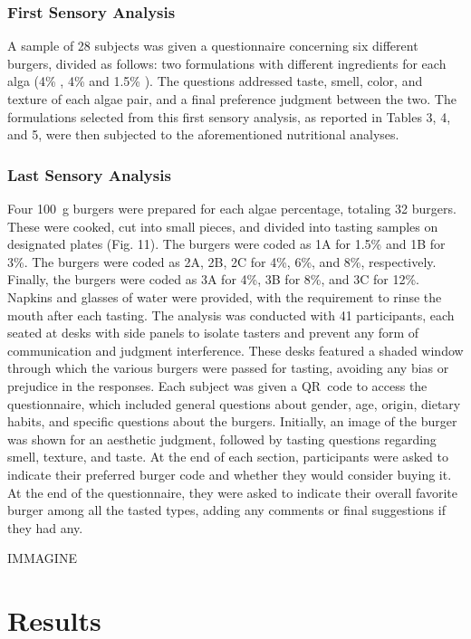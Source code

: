 \subsubsection{First Sensory Analysis}
A sample of 28 subjects was given a questionnaire concerning six different burgers, divided as follows: two formulations with different ingredients for each alga (4\% , 4\%  and 1.5\% ). The questions addressed taste, smell, color, and texture of each algae pair, and a final preference judgment between the two.
The formulations selected from this first sensory analysis, as reported in Tables 3, 4, and 5, were then subjected to the aforementioned nutritional analyses.

\subsubsection{Last Sensory Analysis}
Four \qty{100}{\gram} burgers were prepared for each algae percentage, totaling 32 burgers. These were cooked, cut into small pieces, and divided into tasting samples on designated plates (Fig. 11). The  burgers were coded as 1A for 1.5\% and 1B for 3\%. The  burgers were coded as 2A, 2B, 2C for 4\%, 6\%, and 8\%, respectively. Finally, the  burgers were coded as 3A for 4\%, 3B for 8\%, and 3C for 12\%.
Napkins and glasses of water were provided, with the requirement to rinse the mouth after each tasting. The analysis was conducted with 41 participants, each seated at desks with side panels to isolate tasters and prevent any form of communication and judgment interference. These desks featured a shaded window through which the various burgers were passed for tasting, avoiding any bias or prejudice in the responses. Each subject was given a QR~code to access the questionnaire, which included general questions about gender, age, origin, dietary habits, and specific questions about the burgers. Initially, an image of the burger was shown for an aesthetic judgment, followed by tasting questions regarding smell, texture, and taste. At the end of each section, participants were asked to indicate their preferred burger code and whether they would consider buying it. At the end of the questionnaire, they were asked to indicate their overall favorite burger among all the tasted types, adding any comments or final suggestions if they had any.

IMMAGINE

\section{Results}
